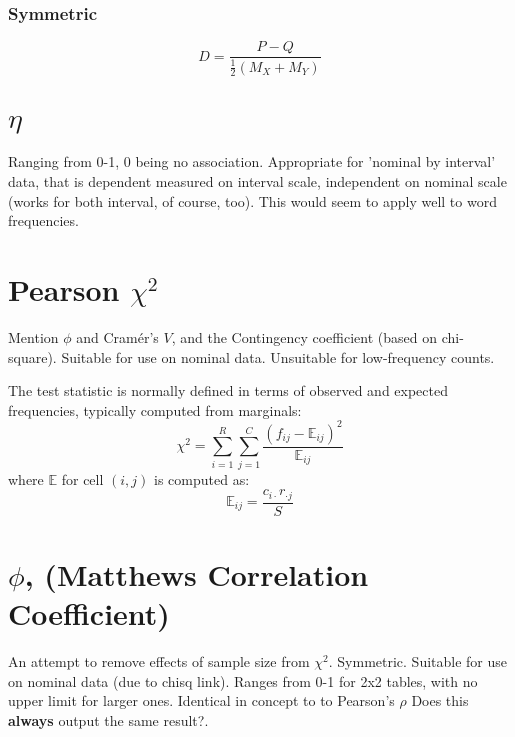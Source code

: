 \documentclass[11pt]{article}
\begin{document}
\subsubsection{Symmetric}
$$
D = \frac{ P - Q }{ \frac{1}{2}( M_X + M_Y ) }
$$






\section{$\eta$}
Ranging from 0-1, 0 being no association.  Appropriate for 'nominal by interval' data, that is dependent measured on interval scale, independent on nominal scale (works for both interval, of course, too).  This would seem to apply well to word frequencies.




\section{Pearson $\chi^2$}
Mention $\phi$ and Cram\'er's $V$, and the Contingency coefficient (based on chi-square).  Suitable for use on nominal data.  Unsuitable for low-frequency counts.

The test statistic is normally defined in terms of observed and expected frequencies, typically computed from marginals:
$$
\chi^2 = \sum_{i=1}^R{  \sum_{j=1}^C{ \frac{ (f_{ij} - \mathbb{E}_{ij} )^2 }{ \mathbb{E}_{ij} } } }
$$
where $\mathbb{E}$ for cell $(i,j)$ is computed as:
$$
\mathbb{E}_{ij} = \frac{ c_{i \cdot} r_{\cdot j} }{ S }
$$


\section{$\phi$, (Matthews Correlation Coefficient)}
\label{section:phi}
An attempt to remove effects of sample size from $\chi^2$.  Symmetric. Suitable for use on nominal data (due to chisq link). %
Ranges from 0-1 for 2x2 tables, with no upper limit for larger ones.  Identical in concept to to Pearson's $\rho$ {\color{red} Does this \textbf{always} output the same result?}.
\end{document}

